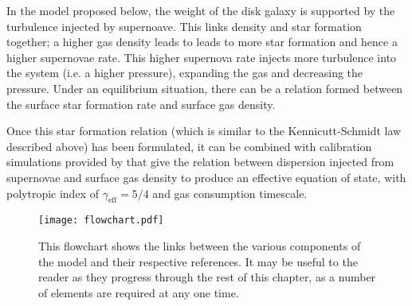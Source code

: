 In the model proposed below, the weight of the disk galaxy is supported by the turbulence injected by supernoave.
This links density and star formation together; a higher gas density leads to leads to more star formation and hence a higher supernovae rate.
This higher supernova rate injects more turbulence into the system (i.e. a higher pressure), expanding the gas and decreasing the pressure.
Under an equilibrium situation, there can be a relation formed between the surface star formation rate and surface gas density.

Once this star formation relation (which is similar to the Kennicutt-Schmidt law described above) has been formulated, it can be combined with calibration simulations provided by \citet{martizzi_supernova_2015} that give the relation between dispersion injected from supernovae and surface gas density to produce an effective equation of state, with polytropic index of $\gamma_\mathrm{eff} = 5/4$ and gas consumption timescale.

\begin{figure}[!ht]
    \centering
    \texttt{[image: flowchart.pdf]}
    \caption{This flowchart shows the links between the various components of the model and their respective references.
    It may be useful to the reader as they progress through the rest of this chapter, as a number of elements are required at any one time.}
    \label{fig:flowchart}
\end{figure}
